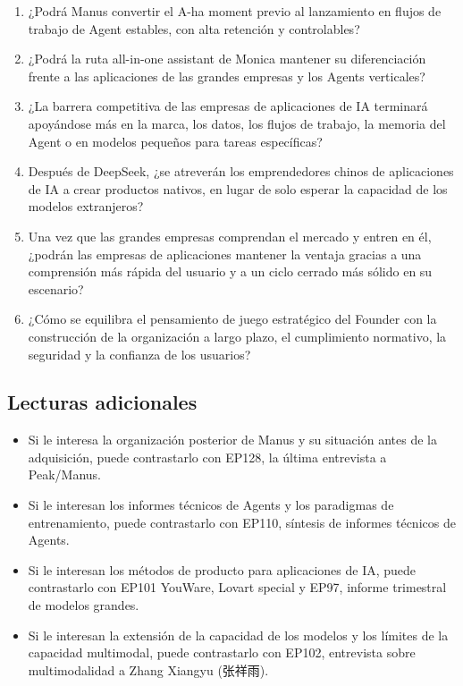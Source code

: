 \documentclass[a4paper]{article}
\begin{document}
\begin{enumerate}
\item ¿Podrá Manus convertir el A-ha moment previo al lanzamiento en flujos de trabajo de Agent estables, con alta retención y controlables?
\item ¿Podrá la ruta all-in-one assistant de Monica mantener su diferenciación frente a las aplicaciones de las grandes empresas y los Agents verticales?
\item ¿La barrera competitiva de las empresas de aplicaciones de IA terminará apoyándose más en la marca, los datos, los flujos de trabajo, la memoria del Agent o en modelos pequeños para tareas específicas?
\item Después de DeepSeek, ¿se atreverán los emprendedores chinos de aplicaciones de IA a crear productos nativos, en lugar de solo esperar la capacidad de los modelos extranjeros?
\item Una vez que las grandes empresas comprendan el mercado y entren en él, ¿podrán las empresas de aplicaciones mantener la ventaja gracias a una comprensión más rápida del usuario y a un ciclo cerrado más sólido en su escenario?
\item ¿Cómo se equilibra el pensamiento de juego estratégico del Founder con la construcción de la organización a largo plazo, el cumplimiento normativo, la seguridad y la confianza de los usuarios?
\end{enumerate}

\subsection{Lecturas adicionales}

\begin{itemize}
\item Si le interesa la organización posterior de Manus y su situación antes de la adquisición, puede contrastarlo con EP128, la última entrevista a Peak/Manus.
\item Si le interesan los informes técnicos de Agents y los paradigmas de entrenamiento, puede contrastarlo con EP110, síntesis de informes técnicos de Agents.
\item Si le interesan los métodos de producto para aplicaciones de IA, puede contrastarlo con EP101 YouWare, Lovart special y EP97, informe trimestral de modelos grandes.
\item Si le interesan la extensión de la capacidad de los modelos y los límites de la capacidad multimodal, puede contrastarlo con EP102, entrevista sobre multimodalidad a Zhang Xiangyu (张祥雨).
\end{itemize}
\end{document}
